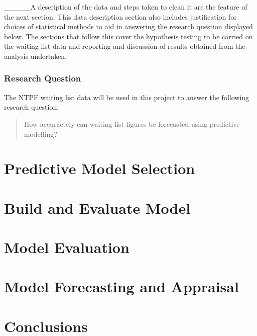 \documentclass[
  12pt,
]{article}
\begin{document}
\_\_\_\_\_A description of the data and steps taken to clean it are the feature of the next section. This data description section also includes justification for choices of statistical methods to aid in answering the research question displayed below. The sections that follow this cover the hypothesis testing to be carried on the waiting list data and reporting and discussion of results obtained from the analysis undertaken.

\hypertarget{research-question}{%
\subsubsection{Research Question}\label{research-question}}

The NTPF waiting list data will be used in this project to answer the following research question:

\begin{quote}
How accuractely can waiting list figures be forecasted using predictive modelling?
\end{quote}

\hypertarget{predictive-model-selection}{%
\section{Predictive Model Selection}\label{predictive-model-selection}}

\hypertarget{build-and-evaluate-model}{%
\section{Build and Evaluate Model}\label{build-and-evaluate-model}}

\hypertarget{model-evaluation}{%
\section{Model Evaluation}\label{model-evaluation}}

\hypertarget{model-forecasting-and-appraisal}{%
\section{Model Forecasting and Appraisal}\label{model-forecasting-and-appraisal}}

\hypertarget{conclusions}{%
\section{Conclusions}\label{conclusions}}
\end{document}
